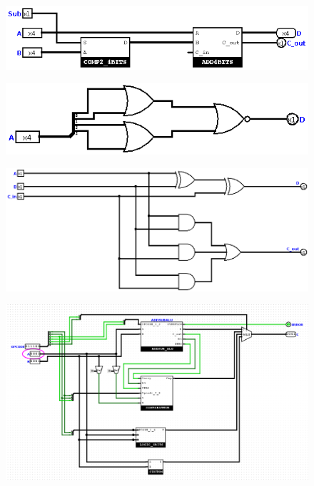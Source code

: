 \documentclass[a4paper]{article}
\begin{document}
\begin{figure}[H]
    \centering
    \includegraphics[width=\textwidth]{src/ADDSUB_4BITS.png}
    \label{fig:ISZERO}
\end{figure}

\begin{figure}[H]
    \centering
    \includegraphics[width=\textwidth]{src/ISZERO_4BITS.png}
    \label{fig:ISZERO}
\end{figure}


\begin{figure}[H]
     \centering
    \includegraphics[width=\textwidth]{src/ADD_1BIT.png}
    \label{fig:ADD_1BIT}
\end{figure}


\begin{figure}[H]
    \centering
    \includegraphics[width=\textwidth]{src/ALU_TEST_COMP_111.png}
    \label{fig:TEST_ALU_COMP_111}
\end{figure}
\end{document}
